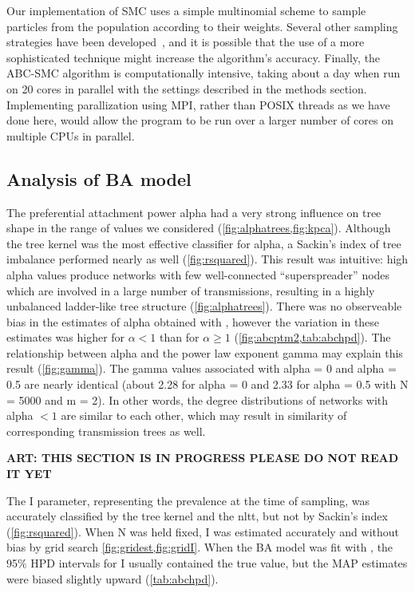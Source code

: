 Our implementation of \gls{SMC} uses a simple multinomial scheme to sample
particles from the population according to their weights. Several other
sampling strategies have been developed~\autocite{douc2005comparison}, and it
is possible that the use of a more sophisticated technique might increase the
algorithm's accuracy. Finally, the \gls{ABC}-\gls{SMC} algorithm is
computationally intensive, taking about a day when run on 20 cores in parallel
with the settings described in the methods section. Implementing parallization
using MPI, rather than POSIX threads as we have done here, would allow the
program to be run over a larger number of cores on multiple CPUs in parallel.

\subsection{Analysis of \acrlong{BA} model}

The preferential attachment power \gls{alpha} had a very strong influence on
tree shape in the range of values we considered
(\cref{fig:alphatrees,fig:kpca}). Although the tree kernel was the most
effective classifier for \gls{alpha}, a Sackin's index of tree imbalance
performed nearly as well (\cref{fig:rsquared}). This result was intuitive: high
\gls{alpha} values produce networks with few well-connected ``superspreader''
nodes which are involved in a large number of transmissions, resulting in a
highly unbalanced ladder-like tree structure (\cref{fig:alphatrees}). There was
no observeable bias in the estimates of \gls{alpha} obtained with
, however the variation in these estimates was higher for
$\alpha < 1$ than for $\alpha \geq 1$ (\cref{fig:abcptm2,tab:abchpd}). The
relationship between \gls{alpha} and the power law exponent \gls{gamma} may
explain this result (\cref{fig:gamma}). The \gls{gamma} values associated with
\gls{alpha} = 0 and \gls{alpha} = 0.5 are nearly identical (about 2.28 for
\gls{alpha} = 0 and 2.33 for \gls{alpha} = 0.5 with \gls{N} = 5000 and \gls{m}
= 2). In other words, the degree distributions of networks with \gls{alpha} $<
1$ are similar to each other, which may result in similarity of corresponding
transmission trees as well. 

\textbf{ART: THIS SECTION IS IN PROGRESS PLEASE DO NOT READ IT YET}

The \gls{I} parameter, representing the prevalence at the time of sampling, was
accurately classified by the tree kernel and the \gls{nltt}, but not by
Sackin's index (\cref{fig:rsquared}). When \gls{N} was held fixed, \gls{I} was
estimated accurately and without bias by grid search
\cref{fig:gridest,fig:gridI}. When the \gls{BA} model was fit with
, the 95\% \gls{HPD} intervals for \gls{I} usually contained
the true value, but the \gls{MAP} estimates were biased slightly upward
(\cref{tab:abchpd}). 

